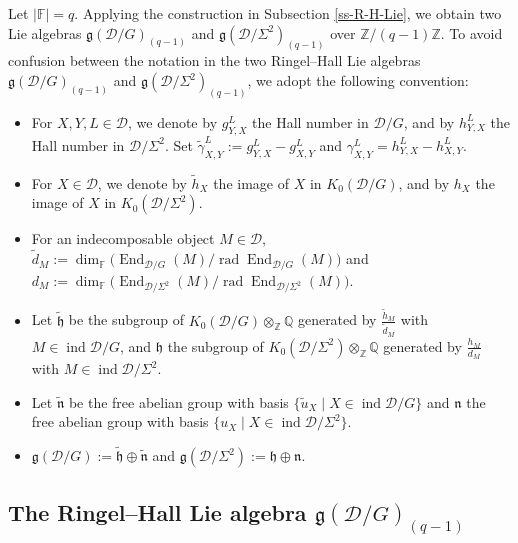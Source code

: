 \documentclass[12pt,reqno]{amsart}
\numberwithin{equation}{section}
\newcommand{\rad}{\operatorname{rad}\nolimits}
\newcommand{\End}{\operatorname{End}\nolimits}
\renewcommand{\dim}{\operatorname{dim}\nolimits}
\newcommand{\go}{{K_0}}
\begin{document}
	Let $|\mathbb{F}|=q$. Applying the construction in Subsection \ref{ss-R-H-Lie}, we obtain two Lie algebras $\mathfrak{g}(\mathcal{D}/G)_{(q-1)}$ and $\mathfrak{g}(\mathcal{D}/\Sigma^2)_{(q-1)}$ over $\mathbb{Z}/(q-1)\mathbb{Z}$. To avoid confusion between the notation in the two Ringel--Hall Lie algebras
	$\mathfrak{g}(\mathcal{D}/G)_{(q-1)}$ and
	$\mathfrak{g}(\mathcal{D}/\Sigma^2)_{(q-1)}$, we adopt the following convention:
	\begin{itemize}
		\item For $X,Y,L\in \mathcal{D}$, we  denote  by $g_{Y,X}^L$  the Hall number in $\mathcal{D}/G$, and by $h_{Y,X}^L$ the Hall number in $\mathcal{D}/\Sigma^2$. Set $\tilde{\gamma}_{X,Y}^L:=g_{Y,X}^L-g_{X,Y}^L$ and $\gamma_{X,Y}^L=h_{Y,X}^L-h_{X,Y}^L$.
		\item For $X\in\mathcal{D}$, we denote by $\tilde{h}_X$ the image of $X$ in $\go(\mathcal{D}/G)$, and by $h_X$ the image of $X$ in $\go(\mathcal{D}/\Sigma^2)$.
		\item For an indecomposable object $M\in \mathcal{D}$, $\tilde{d}_M:=\dim_{\mathbb{F}} \big(\End_{\mathcal{D}/G}(M)/\rad \End_{\mathcal{D}/G}(M)\big)$ and $d_M:=\dim_{\mathbb{F}} \big(\End_{\mathcal{D}/\Sigma^2}(M)/\rad \End_{\mathcal{D}/\Sigma^2}(M)\big)$.
		\item Let $\tilde{\mathfrak{h}}$ be the subgroup of $\go(\mathcal{D}/G)\otimes_\mathbb{Z} \mathbb{Q}$ generated by $\frac{\tilde{h}_M}{\tilde{d}_M}$ with $M\in \operatorname{ind} \mathcal{D}/G$, and $\mathfrak{h}$ the subgroup of $\go(\mathcal{D}/\Sigma^2)\otimes_{\mathbb{Z}}\mathbb{Q}$ generated by $\frac{h_M}{d_M}$ with $M\in \operatorname{ind} \mathcal{D}/\Sigma^2$.
		
		\item Let $\tilde{\mathfrak{n}}$ be the free abelian group with basis $\{\tilde{u}_X\mid X\in \operatorname{ind} \mathcal{D}/G\}$ and $\mathfrak{n}$ the free abelian group with basis $\{u_X\mid X\in \operatorname{ind} \mathcal{D}/\Sigma^2\}$.
		\item $\mathfrak{g}(\mathcal{D}/G):=\tilde{\mathfrak{h}}\oplus \tilde{\mathfrak{n}}$ and $\mathfrak{g}(\mathcal{D}/\Sigma^2):=\mathfrak{h}\oplus \mathfrak{n}$.
	\end{itemize}
	
	
	
	\subsection{The Ringel--Hall Lie algebra $\mathfrak{g}(\mathcal{D}/G)_{(q-1)}$}\label{ss:sur-inj of R-H-Lie}
	
\end{document}
